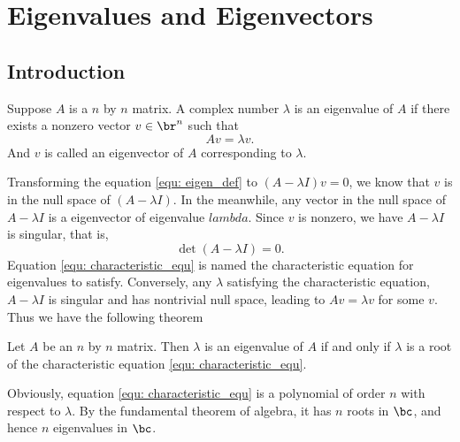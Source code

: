 \chapter{Eigenvalues and Eigenvectors}

\section{Introduction}
\begin{defn}
Suppose $A$ is a $n$ by $n$ matrix. A complex number $\lambda$ is an 
eigenvalue of $A$ if there exists a nonzero vector $v \in \br^n$ such that 
\begin{equation}
\label{equ: eigen_def}
    Av = \lambda v.
\end{equation} 
And $v$ is called an eigenvector of $A$ corresponding to $\lambda$.
\end{defn}

Transforming the equation \ref{equ: eigen_def} to $(A-\lambda I)v = 0$, we 
know that $v$ is in the null space of $(A - \lambda I)$. In the meanwhile, 
any vector in the null space of $A - \lambda I$ is a eigenvector of 
eigenvalue $lambda$. 
Since $v$ is nonzero, we have $A-\lambda I$ is singular, that is, 
\begin{equation}
\label{equ: characteristic_equ}
    \det(A - \lambda I) = 0.
\end{equation}
Equation \ref{equ: characteristic_equ} is named the characteristic equation 
for eigenvalues to satisfy. Conversely, any $\lambda$ satisfying the 
characteristic equation, $A - \lambda I$ is singular and has nontrivial 
null space, leading to $Av = \lambda v$ for some $v$. Thus we have the 
following theorem 
\begin{thm}
Let $A$ be an $n$ by $n$ matrix. Then $\lambda$ is an eigenvalue of $A$ 
if and only if $\lambda$ is a root of the characteristic equation 
\ref{equ: characteristic_equ}.
\end{thm}

Obviously, equation \ref{equ: characteristic_equ} is a polynomial of order 
$n$ with respect to $\lambda$. By the fundamental theorem of algebra, 
it has $n$ roots in $\bc$, and hence $n$ eigenvalues in $\bc$.

